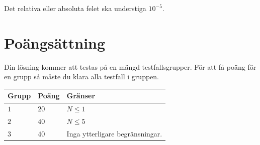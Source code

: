 Det relativa eller absoluta felet ska understiga $10^{-5}$.

\section*{Poängsättning}
Din lösning kommer att testas på en mängd testfallsgrupper.
För att få poäng för en grupp så måste du klara alla testfall i gruppen.

\noindent
\begin{tabular}{| l | l | p{12cm} |}
  \hline
  \textbf{Grupp} & \textbf{Poäng} & \textbf{Gränser} \\ \hline
  $1$    & $20$        & $N \le 1$ \\ \hline 
  $2$    & $40$        & $N \le 5$ \\ \hline
  $3$    & $40$        & Inga ytterligare begränsningar. \\ \hline 
\end{tabular}
